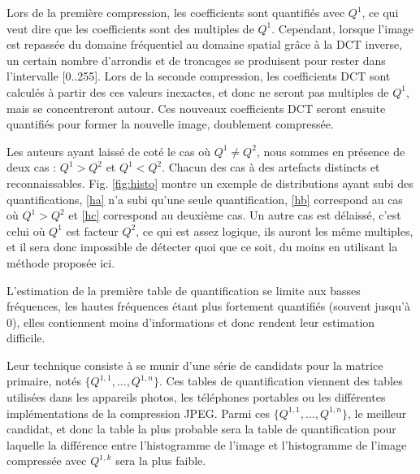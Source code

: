 \documentclass[utf8]{stageM2R} %
\begin{document}
Lors de la première compression, les coefficients sont quantifiés avec $Q^{1}$, ce qui veut dire que les coefficients sont des multiples de $Q^{1}$. Cependant, lorsque l'image est repassée du domaine fréquentiel au domaine spatial grâce à la DCT inverse, un certain nombre d'arrondis et de troncages se produisent pour rester dans l'intervalle [0..255]. Lors de la seconde compression, les coefficients DCT sont calculés à partir des ces valeurs inexactes, et donc ne seront pas multiples de $Q^{1}$, mais se concentreront autour. Ces nouveaux coefficients DCT seront ensuite quantifiés pour former la nouvelle image, doublement compressée.

Les auteurs ayant laissé de coté le cas où $Q^{1} \neq Q^{2}$, nous sommes en présence de deux cas : $Q^{1} > Q^{2}$ et $Q^{1} < Q^{2}$. Chacun des cas à des artefacts distincts et reconnaissables. Fig. \ref{fig:histo} montre un exemple de distributions ayant subi des quantifications, \ref{ha} n'a subi qu'une seule quantification, \ref{hb} correspond au cas où $Q^{1} > Q^{2}$ et \ref{hc} correspond au deuxième cas. Un autre cas est délaissé, c'est celui où $Q^{1}$ est facteur $Q^{2}$, ce qui est assez logique, ils auront les même multiples, et il sera donc impossible de détecter quoi que ce soit, du moins en utilisant la méthode proposée ici.

L'estimation de la première table de quantification se limite aux basses fréquences, les hautes fréquences étant plus fortement quantifiés (souvent jusqu'à 0), elles contiennent moins d'informations et donc rendent leur estimation difficile.

Leur technique consiste à se munir d'une série de candidats pour la matrice primaire, notés $\{Q^{1,1},...,Q^{1,n}\}$. Ces tables de quantification viennent des tables utilisées dans les appareils photos, les téléphones portables ou les différentes implémentations de la compression JPEG. Parmi ces $\{Q^{1,1},...,Q^{1,n}\}$, le meilleur candidat, et donc la table la plus probable sera la table de quantification pour laquelle la différence entre l'histogramme de l'image et l'histogramme de l'image compressée avec $Q^{1,k}$ sera la plus faible.


\end{document}
